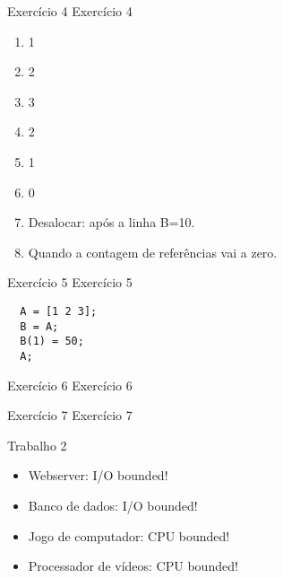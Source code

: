 \documentclass{beamer}
\begin{document}
\begin{frame}[fragile]{Exercício 4}
  \centering
  \Large
  Exercício 4
  \begin{enumerate}
    \item <2-> 1
    \item <3-> 2
    \item <4-> 3
    \item <5-> 2
    \item <6-> 1
    \item <7-> 0
    \item <8-> Desalocar: após a linha \textsc{B=10}.
    \item <9-> Quando a contagem de referências vai a zero.
  \end{enumerate}
\end{frame}

\begin{frame}[fragile]{Exercício 5}
  \centering
  \Large
  Exercício 5
  \begin{verbatim}
  A = [1 2 3];
  B = A;
  B(1) = 50;
  A;
  \end{verbatim}
\end{frame}

\begin{frame}[fragile]{Exercício 6}
  \centering
  \Large
  Exercício 6
\end{frame}

\begin{frame}[fragile]{Exercício 7}
  \centering
  \Large
  Exercício 7
\end{frame}


\begin{frame}[fragile]{Trabalho 2}
  \centering
  \Large
  \begin{itemize}
  \item <2-> Webserver: I/O bounded!
  \item <3-> Banco de dados: I/O bounded!
  \item <4-> Jogo de computador: CPU bounded!
  \item <5-> Processador de vídeos: CPU bounded!
  \end{itemize}
\end{frame}
\end{document}
